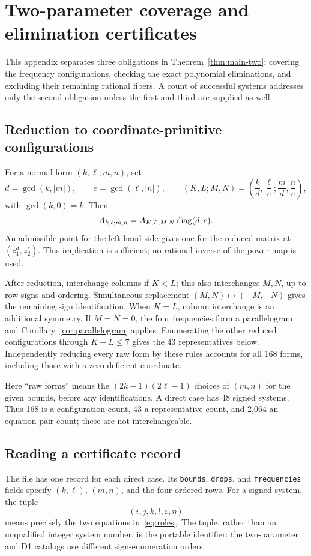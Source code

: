 \section{Two-parameter coverage and elimination certificates}\label{app:representatives}
This appendix separates three obligations in Theorem~\ref{thm:main-two}: covering the frequency configurations, checking the exact polynomial eliminations, and excluding their remaining rational fibers. A count of successful systems addresses only the second obligation unless the first and third are supplied as well.

\subsection{Reduction to coordinate-primitive configurations}
For a normal form $(k,\ell;m,n)$, set
\[
 d=\gcd(k,|m|),\qquad e=\gcd(\ell,|n|),\qquad
 (K,L;M,N)=\left(\frac{k}{d},\frac{\ell}{e};\frac{m}{d},\frac{n}{e}\right),
\]
with $\gcd(k,0)=k$. Then
\[
 A_{k,\ell;m,n}=A_{K,L;M,N}\operatorname{diag}(d,e).
\]
An admissible point for the left-hand side gives one for the reduced matrix at $(z_1^d,z_2^e)$. This implication is sufficient; no rational inverse of the power map is used.

After reduction, interchange columns if $K<L$; this also interchanges $M,N$, up to row signs and ordering. Simultaneous replacement $(M,N)\mapsto(-M,-N)$ gives the remaining sign identification. When $K=L$, column interchange is an additional symmetry. If $M=N=0$, the four frequencies form a parallelogram and Corollary~\ref{cor:parallelogram} applies. Enumerating the other reduced configurations through $K+L\le7$ gives the 43 representatives below. Independently reducing every raw form by these rules accounts for all 168 forms, including those with a zero deficient coordinate.



Here ``raw forms'' means the $(2k-1)(2\ell-1)$ choices of $(m,n)$ for the given bounds, before any identifications. A direct case has 48 signed systems. Thus 168 is a configuration count, 43 a representative count, and 2,064 an equation-pair count; these are not interchangeable.



\subsection{Reading a certificate record}
The file  has one record for each direct case. Its \texttt{bounds}, \texttt{drops}, and \texttt{frequencies} fields specify $(k,\ell)$, $(m,n)$, and the four ordered rows. For a signed system, the tuple
\[
 (i,j,k,l,\varepsilon,\eta)
\]
means precisely the two equations in~\eqref{eq:roles}. The tuple, rather than an unqualified integer system number, is the portable identifier: the two-parameter and D1 catalogs use different sign-enumeration orders.

